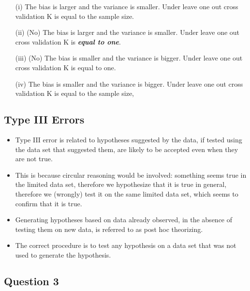 \documentclass[caret-main.tex]{subfiles}
\begin{document}
\begin{itemize}
\item[(i)]The bias is larger and the variance is smaller. Under leave one out cross validation K is equal to the sample size.			
\item[(ii)] (No) The bias is larger and the variance is smaller. Under leave one out cross validation K is \textbf{\textit{equal to one}}.			
\item[(iii)] (No) The bias is smaller and the variance is bigger. Under leave one out cross validation K is equal to one.
\item[(iv)] The bias is smaller and the variance is bigger. Under leave one out cross validation K is equal to the sample size,
\end{itemize}
\newpage

\newpage
\subsection{Type III Errors}

\begin{itemize}
\item Type III error is related to hypotheses suggested by the data, if tested using the data set that suggested them, are likely to be accepted even when they are not true. 

\item This is because circular reasoning would be involved: something seems true in the limited data set, therefore we hypothesize that it is true in general, therefore we (wrongly) test it on the same limited data set, which seems to confirm that it is true. 

\item Generating hypotheses based on data already observed, in the absence of testing them on new data, is referred to as post hoc theorizing.


\item The correct procedure is to test any hypothesis on a data set that was not used to generate the hypothesis.
\end{itemize}


\newpage
\subsection*{Question 3}
\end{document}
